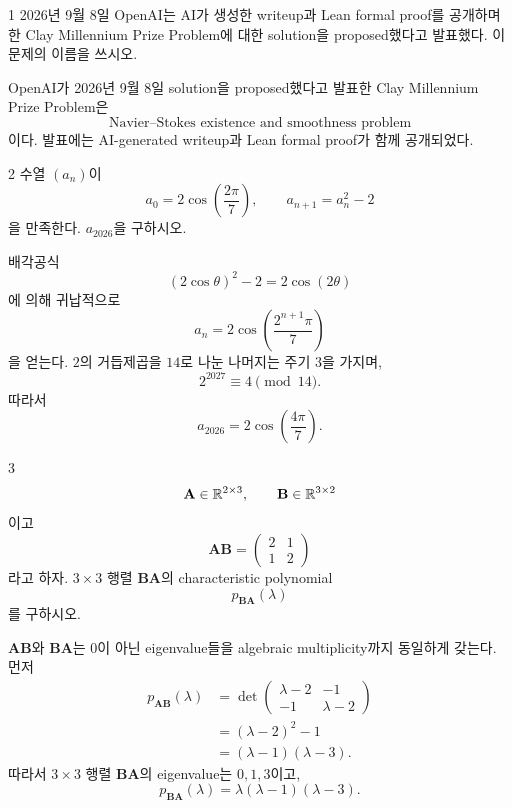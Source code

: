 
\begin{problem}{1}
2026년 9월 8일 OpenAI는 AI가 생성한 writeup과 Lean formal proof를 공개하며 한 Clay Millennium Prize Problem에 대한 solution을 proposed했다고 발표했다. 이 문제의 이름을 쓰시오.
\end{problem}

\begin{solution}
OpenAI가 2026년 9월 8일 solution을 proposed했다고 발표한 Clay Millennium Prize Problem은
\[
    \boxed{\text{Navier--Stokes existence and smoothness problem}}
\]
이다. 발표에는 AI-generated writeup과 Lean formal proof가 함께 공개되었다.
\end{solution}

\begin{problem}{2}
수열 $(a_n)$이
\[
    a_0=2\cos\left(\frac{2\pi}{7}\right),
    \qquad
    a_{n+1}=a_n^2-2
\]
을 만족한다. $a_{2026}$을 구하시오.
\end{problem}

\begin{solution}
배각공식
\[
    (2\cos\theta)^2-2=2\cos(2\theta)
\]
에 의해 귀납적으로
\[
    a_n
    =
    2\cos\left(\frac{2^{n+1}\pi}{7}\right)
\]
을 얻는다. $2$의 거듭제곱을 $14$로 나눈 나머지는 주기 $3$을 가지며,
\[
    2^{2027}\equiv4\pmod{14}.
\]
따라서
\[
    \boxed{a_{2026}=2\cos\left(\frac{4\pi}{7}\right)}.
\]
\end{solution}

\begin{problem}{3}
\[
    \mathbf{A}\in\mathbb{R}^{2\times3},
    \qquad
    \mathbf{B}\in\mathbb{R}^{3\times2}
\]
이고
\[
    \mathbf{A}\mathbf{B}
    =
    \begin{pmatrix}
        2&1\\
        1&2
    \end{pmatrix}
\]
라고 하자. $3\times3$ 행렬 $\mathbf{B}\mathbf{A}$의 characteristic polynomial
\[
    p_{\mathbf{B}\mathbf{A}}(\lambda)
\]
를 구하시오.
\end{problem}

\begin{solution}
$\mathbf{A}\mathbf{B}$와 $\mathbf{B}\mathbf{A}$는 $0$이 아닌 eigenvalue들을 algebraic multiplicity까지 동일하게 갖는다. 먼저
\[
    \begin{aligned}
        p_{\mathbf{A}\mathbf{B}}(\lambda)
        &=
        \det\!\begin{pmatrix}
            \lambda-2&-1\\
            -1&\lambda-2
        \end{pmatrix}\\
        &=(\lambda-2)^2-1\\
        &=(\lambda-1)(\lambda-3).
    \end{aligned}
\]
따라서 $3\times3$ 행렬 $\mathbf{B}\mathbf{A}$의 eigenvalue는 $0,1,3$이고,
\[
    \boxed{
        p_{\mathbf{B}\mathbf{A}}(\lambda)
        =
        \lambda(\lambda-1)(\lambda-3)
    }.
\]
\end{solution}

